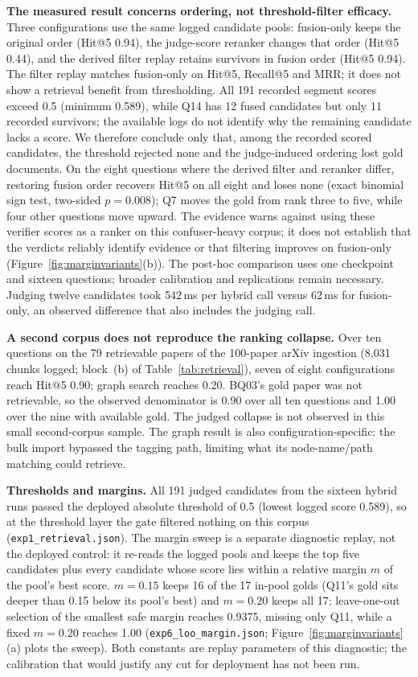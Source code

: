 \textbf{The measured result concerns ordering, not threshold-filter efficacy.}
Three configurations use the same logged candidate pools: fusion-only keeps
the original order (Hit@5 0.94), the judge-score reranker changes that order
(Hit@5 0.44), and the derived filter replay retains survivors in fusion order
(Hit@5 0.94). The filter replay matches fusion-only on Hit@5, Recall@5 and MRR;
it does not show a retrieval benefit from thresholding. All 191 recorded
segment scores exceed 0.5 (minimum 0.589), while Q14 has 12 fused candidates
but only 11 recorded survivors; the available logs do not identify why the
remaining candidate lacks a score. We therefore conclude only that, among the
recorded scored candidates, the threshold rejected none and the judge-induced
ordering lost gold documents. On the eight questions where the derived filter
and reranker differ, restoring fusion order recovers Hit@5 on all eight and
loses none (exact binomial sign test, two-sided $p=0.008$); Q7 moves the gold
from rank three to five, while four other questions move upward. The evidence
warns against using these verifier scores as a ranker on this confuser-heavy
corpus; it does not establish that the verdicts reliably identify evidence or
that filtering improves on fusion-only (Figure~\ref{fig:marginvariants}(b)).
The post-hoc comparison uses one checkpoint and sixteen questions; broader
calibration and replications remain necessary. Judging twelve candidates took
542\,ms per hybrid call versus 62\,ms for fusion-only, an observed difference
that also includes the judging call.

\textbf{A second corpus does not reproduce the ranking collapse.} Over ten
questions on the 79 retrievable papers of the 100-paper arXiv ingestion
(8{,}031 chunks logged; block~(b) of Table~\ref{tab:retrieval}), seven of
eight configurations reach Hit@5 0.90; graph search reaches 0.20. BQ03's
gold paper was not retrievable, so the observed denominator is 0.90 over all
ten questions and 1.00 over the nine with available gold. The judged collapse
is not observed in this small second-corpus sample. The graph result is also
configuration-specific: the bulk import bypassed the tagging path, limiting
what its node-name/path matching could retrieve.

\textbf{Thresholds and margins.} All 191 judged candidates from the
sixteen hybrid runs passed the deployed absolute threshold of 0.5 (lowest
logged score 0.589), so at the threshold layer the gate filtered nothing on
this corpus (\texttt{exp1\_retrieval.json}). The margin sweep is a separate
diagnostic replay, not the deployed control: it re-reads the logged pools
and keeps the top five candidates plus every candidate whose score lies
within a relative margin $m$ of the pool's best score. $m=0.15$ keeps 16 of
the 17 in-pool golds (Q11's gold sits deeper than 0.15 below its pool's
best) and $m=0.20$ keeps all 17; leave-one-out selection of the smallest
safe margin reaches 0.9375, missing only Q11, while a fixed $m=0.20$
reaches 1.00 (\texttt{exp6\_loo\_margin.json};
Figure~\ref{fig:marginvariants}(a) plots the sweep). Both constants are
replay parameters of this diagnostic; the calibration that would justify any
cut for deployment has not been run.

